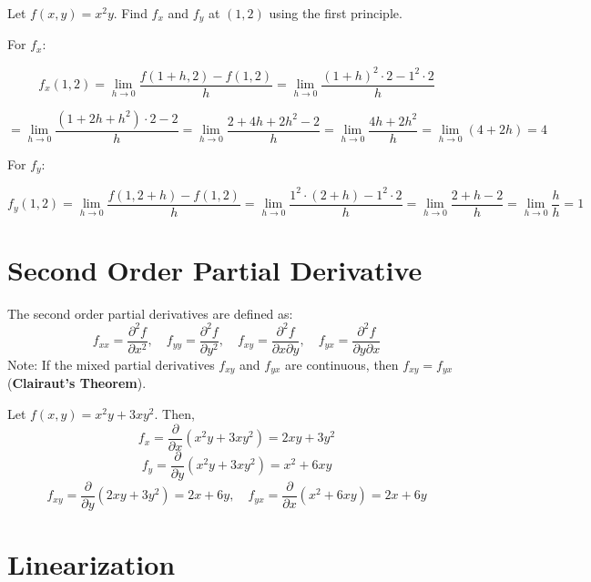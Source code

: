 \begin{eg}
  Let \( f(x, y) = x^2y \). Find \( f_x \) and \( f_y \) at \( (1, 2) \) using the first principle.

  For \( f_x \):

  \[
    f_x(1, 2) = \lim_{h \to 0} \frac{f(1 + h, 2) - f(1, 2)}{h}
    = \lim_{h \to 0} \frac{(1 + h)^2 \cdot 2 - 1^2 \cdot 2}{h}
  \]

  \[
    = \lim_{h \to 0} \frac{(1 + 2h + h^2) \cdot 2 - 2}{h}
    = \lim_{h \to 0} \frac{2 + 4h + 2h^2 - 2}{h}
    = \lim_{h \to 0} \frac{4h + 2h^2}{h} = \lim_{h \to 0} (4 + 2h) = 4
  \]

  For \( f_y \):

  \[
    f_y(1, 2) = \lim_{h \to 0} \frac{f(1, 2 + h) - f(1, 2)}{h}
    = \lim_{h \to 0} \frac{1^2 \cdot (2 + h) - 1^2 \cdot 2}{h}
    = \lim_{h \to 0} \frac{2 + h - 2}{h}
    = \lim_{h \to 0} \frac{h}{h} = 1
  \]
\end{eg}

\section{Second Order Partial Derivative}
\label{sec:second-order-partial-derivative}

\begin{definition}
  \label{def:second-order-partial-derivative}
  The second order partial derivatives are defined as:
  \[
    f_{xx} = \frac{\partial^2 f}{\partial x^2}, \quad
    f_{yy} = \frac{\partial^2 f}{\partial y^2}, \quad
    f_{xy} = \frac{\partial^2 f}{\partial x \partial y}, \quad
    f_{yx} = \frac{\partial^2 f}{\partial y \partial x}
  \]
  Note: If the mixed partial derivatives \( f_{xy} \) and \( f_{yx} \) are continuous, then \( f_{xy} = f_{yx} \) (\textbf{Clairaut’s Theorem}).
\end{definition}

\begin{eg}
  Let \( f(x, y) = x^2y + 3xy^2 \). Then,
  \[
    f_x = \frac{\partial}{\partial x}(x^2y + 3xy^2) = 2xy + 3y^2
  \]
  \[
    f_y = \frac{\partial}{\partial y}(x^2y + 3xy^2) = x^2 + 6xy
  \]
  \[
    f_{xy} = \frac{\partial}{\partial y}(2xy + 3y^2) = 2x + 6y, \quad f_{yx} = \frac{\partial}{\partial x}(x^2 + 6xy) = 2x + 6y
  \]
\end{eg}

\section{Linearization}

